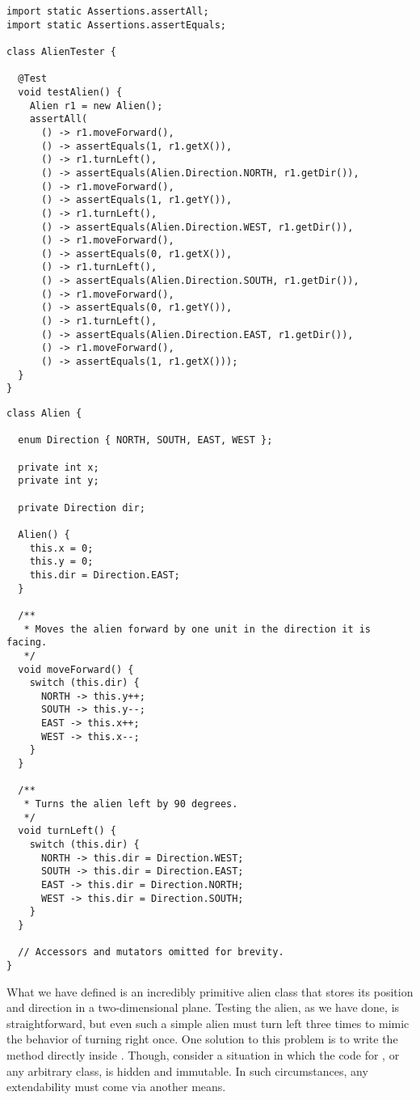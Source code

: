 \begin{lstlisting}[language=MyJava]
import static Assertions.assertAll;
import static Assertions.assertEquals;

class AlienTester {

  @Test
  void testAlien() {
    Alien r1 = new Alien();
    assertAll(
      () -> r1.moveForward(),
      () -> assertEquals(1, r1.getX()),
      () -> r1.turnLeft(),
      () -> assertEquals(Alien.Direction.NORTH, r1.getDir()),
      () -> r1.moveForward(),
      () -> assertEquals(1, r1.getY()),
      () -> r1.turnLeft(),
      () -> assertEquals(Alien.Direction.WEST, r1.getDir()),
      () -> r1.moveForward(),
      () -> assertEquals(0, r1.getX()),
      () -> r1.turnLeft(),
      () -> assertEquals(Alien.Direction.SOUTH, r1.getDir()),
      () -> r1.moveForward(),
      () -> assertEquals(0, r1.getY()),
      () -> r1.turnLeft(),
      () -> assertEquals(Alien.Direction.EAST, r1.getDir()),
      () -> r1.moveForward(),
      () -> assertEquals(1, r1.getX()));
  }
}
\end{lstlisting}

\begin{lstlisting}[language=MyJava]
class Alien {

  enum Direction { NORTH, SOUTH, EAST, WEST };

  private int x;
  private int y;

  private Direction dir;

  Alien() {
    this.x = 0;
    this.y = 0;
    this.dir = Direction.EAST;
  }

  /**
   * Moves the alien forward by one unit in the direction it is facing.
   */
  void moveForward() {
    switch (this.dir) {
      NORTH -> this.y++;
      SOUTH -> this.y--;
      EAST -> this.x++;
      WEST -> this.x--;
    }
  }

  /**
   * Turns the alien left by 90 degrees.
   */
  void turnLeft() {
    switch (this.dir) {
      NORTH -> this.dir = Direction.WEST;
      SOUTH -> this.dir = Direction.EAST;
      EAST -> this.dir = Direction.NORTH;
      WEST -> this.dir = Direction.SOUTH;
    }
  }

  // Accessors and mutators omitted for brevity.
}
\end{lstlisting}

What we have defined is an incredibly primitive alien class that stores its position and direction in a two-dimensional plane. Testing the alien, as we have done, is straightforward, but even such a simple alien must turn left three times to mimic the behavior of turning right once. One solution to this problem is to write the  method directly inside . Though, consider a situation in which the code for , or any arbitrary class, is hidden and immutable. In such circumstances, any extendability must come via another means. 

